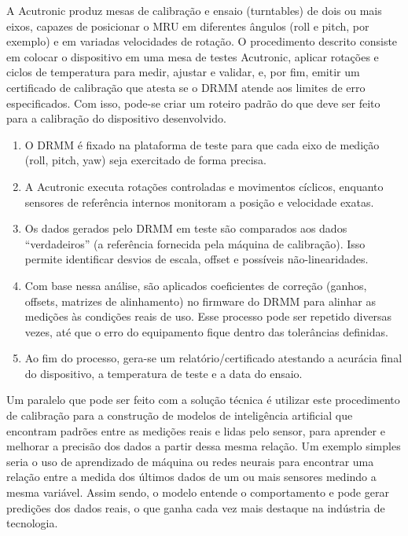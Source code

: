 \documentclass[a4paper, 12pt]{article}
\begin{document}
        A Acutronic produz mesas de calibração e ensaio (turntables) de dois ou mais eixos, capazes de posicionar o MRU em diferentes ângulos (roll e pitch, por exemplo) e em variadas velocidades de rotação. O procedimento descrito consiste em colocar o dispositivo em uma mesa de testes Acutronic, aplicar rotações e ciclos de temperatura para medir, ajustar e validar, e, por fim, emitir um certificado de calibração que atesta se o DRMM atende aos limites de erro especificados. Com isso, pode-se criar um roteiro padrão do que deve ser feito para a calibração do dispositivo desenvolvido.

        \begin{enumerate}
            \item O DRMM é fixado na plataforma de teste para que cada eixo de medição (roll, pitch, yaw) seja exercitado de forma precisa.
            
            \item A Acutronic executa rotações controladas e movimentos cíclicos, enquanto sensores de referência internos monitoram a posição e velocidade exatas.
            
            \item Os dados gerados pelo DRMM em teste são comparados aos dados “verdadeiros” (a referência fornecida pela máquina de calibração). Isso permite identificar desvios de escala, offset e possíveis não-linearidades.
            
            \item Com base nessa análise, são aplicados coeficientes de correção (ganhos, offsets, matrizes de alinhamento) no firmware do DRMM para alinhar as medições às condições reais de uso. Esse processo pode ser repetido diversas vezes, até que o erro do equipamento fique dentro das tolerâncias definidas.
            
            \item Ao fim do processo, gera-se um relatório/certificado atestando a acurácia final do dispositivo, a temperatura de teste e a data do ensaio.
        \end{enumerate}

        Um paralelo que pode ser feito com a solução técnica é utilizar este procedimento de calibração para a construção de modelos de inteligência artificial que encontram padrões entre as medições reais e lidas pelo sensor, para aprender e melhorar a precisão dos dados a partir dessa mesma relação. Um exemplo simples seria o uso de aprendizado de máquina ou redes neurais para encontrar uma relação entre a medida dos últimos dados de um ou mais sensores medindo a mesma variável. Assim sendo, o modelo entende o comportamento e pode gerar predições dos dados reais, o que ganha cada vez mais destaque na indústria de tecnologia.
    
\end{document}
